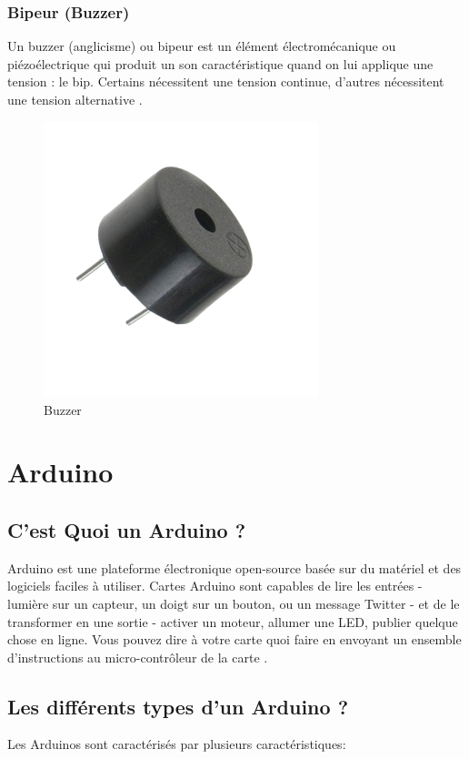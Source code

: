 \subsubsection{Bipeur (Buzzer)}
\label{buzzer}
Un buzzer (anglicisme) ou bipeur est un élément électromécanique ou piézoélectrique qui produit un son caractéristique quand on lui applique une tension : le bip. Certains nécessitent une tension continue, d'autres nécessitent une tension alternative \cite{frwiki:178425382e}.

\begin{figure}[!htbp]
    \centering
    \includegraphics[width=8cm]{assets/buzzer.png}
    \caption{Buzzer}
\end{figure}

\FloatBarrier

\section{Arduino}

\subsection{C'est Quoi un Arduino ?}
Arduino est une plateforme électronique open-source basée sur du matériel et des logiciels faciles à utiliser. Cartes Arduino sont capables de lire les entrées - lumière sur un capteur, un doigt sur un bouton, ou un message Twitter - et de le transformer en une sortie - activer un moteur, allumer une LED, publier quelque chose en ligne. Vous pouvez dire à votre carte quoi faire en envoyant un ensemble d’instructions au micro-contrôleur de la carte \cite{arduino-introduction}.

\subsection{Les différents types d'un Arduino ?}
Les Arduinos sont caractérisés par plusieurs caractéristiques:

